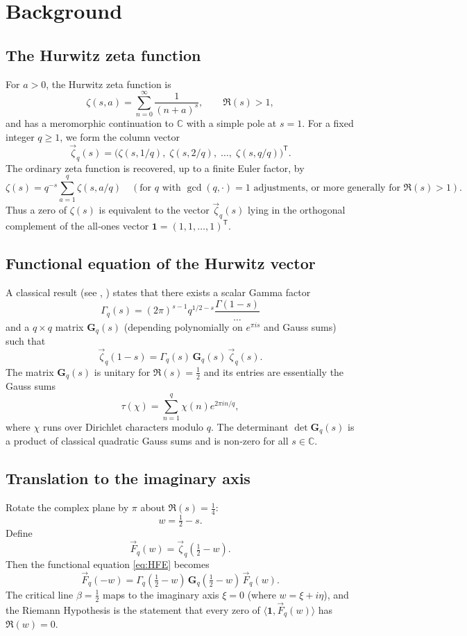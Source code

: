 \documentclass{article}
\theoremstyle{definition}
\begin{document}
\section{Background}

\subsection{The Hurwitz zeta function}
For \(a>0\), the Hurwitz zeta function is
\[
\zeta(s,a) = \sum_{n=0}^{\infty} \frac{1}{(n+a)^s}, \qquad \Re(s)>1,
\]
and has a meromorphic continuation to \(\mathbb{C}\) with a simple pole at \(s=1\). For a fixed integer \(q\ge 1\), we form the column vector
\[
\vec{\zeta}_q(s) = \bigl( \zeta(s,1/q),\; \zeta(s,2/q),\;\dots,\; \zeta(s,q/q) \bigr)^{\mathsf T}.
\]
The ordinary zeta function is recovered, up to a finite Euler factor, by
\begin{equation}\label{eq:recovery}
\zeta(s) = q^{-s} \sum_{a=1}^q \zeta(s,a/q) \quad (\text{for } q \text{ with } \gcd(q,\cdot)=1\text{ adjustments, or more generally for } \Re(s)>1).
\end{equation}
Thus a zero of \(\zeta(s)\) is equivalent to the vector \(\vec{\zeta}_q(s)\) lying in the orthogonal complement of the all‑ones vector \(\mathbf{1} = (1,1,\dots,1)^{\mathsf T}\).

\subsection{Functional equation of the Hurwitz vector}
A classical result (see \cite{LangSC}, \cite{Huxley}) states that there exists a scalar Gamma factor
\[
\Gamma_{\!q}(s) = (2\pi)^{s-1} q^{1/2-s} \frac{\Gamma(1-s)}{\dots}
\]
and a \(q\times q\) matrix \(\mathbf{G}_q(s)\) (depending polynomially on \(e^{\pi i s}\) and Gauss sums) such that
\begin{equation}\label{eq:HFE}
\vec{\zeta}_q(1-s) = \Gamma_{\!q}(s)\, \mathbf{G}_q(s)\, \vec{\zeta}_q(s).
\end{equation}
The matrix \(\mathbf{G}_q(s)\) is unitary for \(\Re(s)=\tfrac12\) and its entries are essentially the Gauss sums
\[
\tau(\chi) = \sum_{n=1}^q \chi(n) e^{2\pi i n/q},
\]
where \(\chi\) runs over Dirichlet characters modulo \(q\). The determinant \(\det \mathbf{G}_q(s)\) is a product of classical quadratic Gauss sums and is non‑zero for all \(s\in\mathbb{C}\).

\subsection{Translation to the imaginary axis}
Rotate the complex plane by \(\pi\) about \(\Re(s)=\tfrac14\):
\[
w = \tfrac12 - s.
\]
Define
\[
\vec{F}_q(w) = \vec{\zeta}_q(\tfrac12 - w).
\]
Then the functional equation \eqref{eq:HFE} becomes
\begin{equation}\label{eq:Ffeq}
\vec{F}_q(-w) = \Gamma_{\!q}(\tfrac12 - w)\, \mathbf{G}_q(\tfrac12 - w)\, \vec{F}_q(w).
\end{equation}
The critical line \(\beta=\tfrac12\) maps to the imaginary axis \(\xi=0\) (where \(w=\xi+i\eta\)), and the Riemann Hypothesis is the statement that every zero of \(\langle\mathbf{1},\vec{F}_q(w)\rangle\) has \(\Re(w)=0\).
\end{document}
